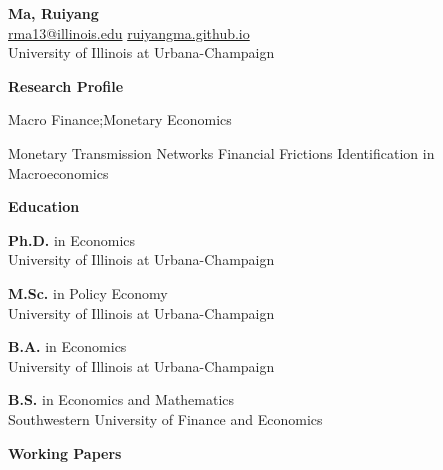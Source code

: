 \documentclass[12pt, letterpaper]{article}
\newlength{\labelcol}
\newcommand{\cvsection}[1]{%
  \vspace{13pt}%
  {\large\bfseries\color{accent} #1}%
  \par\vspace{5pt}%
}
\newcommand{\cvrow}[3]{%
  \noindent%
  \makebox[\labelcol][l]{#1{#2}}%
  \begin{minipage}[t]{\dimexpr\linewidth-\labelcol\relax}%
    \raggedright #3%
  \end{minipage}%
  \par\vspace{3.5pt}%
}
\newcommand{\entry}[2]{\cvrow{\small\color{muted}}{#1}{#2}}
\newcommand{\labelrow}[2]{\cvrow{\small\itshape\color{muted}}{#1}{#2}}
\begin{document}
\thispagestyle{fancy}

\begin{center}
  {\fontsize{26}{30}\selectfont\bfseries Ma, Ruiyang}\\[8pt]
  {\color{muted}%
    \faEnvelope[regular]\enspace
      \href{mailto:rma13@illinois.edu}{\textcolor{accent}{rma13@illinois.edu}}%
    \quad\textbullet\quad
    \faGlobe\enspace
      \href{https://ruiyangma.github.io/ruiyang-ma.github.io/}%
           {\textcolor{accent}{ruiyangma.github.io}}%
  }\\[4pt]
  {\small\color{muted}%
    \faUniversity\enspace University of Illinois at Urbana-Champaign%
  }
\end{center}

\vspace{6pt}

\cvsection{Research Profile}

\labelrow{Fields}{Macro Finance;\enspace Monetary Economics}

\labelrow{Topics}{%
  Monetary Transmission \textbullet\enspace
  Networks \textbullet\enspace
  Financial Frictions \textbullet\enspace
  Identification in Macroeconomics}

\cvsection{Education}

\entry{2023 -- Present}{%
  \textbf{Ph.D.} in Economics\\
  {\small\color{muted}University of Illinois at Urbana-Champaign}}

\entry{2021 -- 2023}{%
  \textbf{M.Sc.} in Policy Economy\\
  {\small\color{muted}University of Illinois at Urbana-Champaign}}

\entry{2018 -- 2020}{%
  \textbf{B.A.} in Economics\\
  {\small\color{muted}University of Illinois at Urbana-Champaign}}

\entry{2016 -- 2018}{%
  \textbf{B.S.} in Economics and Mathematics\\
  {\small\color{muted}Southwestern University of Finance and Economics}}

\cvsection{Working Papers}
\end{document}

